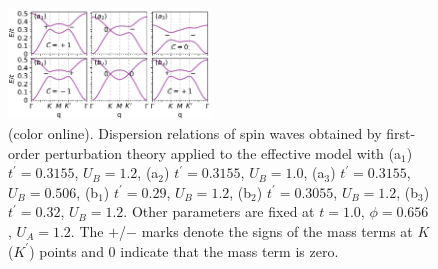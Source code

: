 \documentclass[amsmath,superscriptaddress,showpacs,aps,prl,twocolumn]{revtex4-1}
\begin{document}
\begin{figure}
\centering
\includegraphics[width=0.48\textwidth]{effectivespectra}
\caption{(color online). Dispersion relations of spin waves obtained by first-order perturbation theory applied to the effective model with (a$_1$) $t^\prime=0.3155$, $U_B=1.2$, (a$_2$) $t^\prime=0.3155$, $U_B=1.0$, (a$_3$) $t^\prime=0.3155$, $U_B=0.506$, (b$_1$) $t^\prime=0.29$, $U_B=1.2$, (b$_2$) $t^\prime=0.3055$, $U_B=1.2$, (b$_3$) $t^\prime=0.32$, $U_B=1.2$. Other parameters are fixed at $t=1.0$, $\phi=0.656$, $U_A=1.2$. The $+$/$-$ marks denote the signs of the mass terms at $K$($K^\prime$) points and $0$ indicate that the mass term is zero.}
\label{effectivespectra}
\end{figure}
\end{document}
